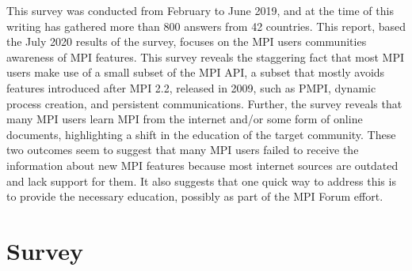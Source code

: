 \documentclass[sigconf,nonacm]{acmart}
\begin{document}
This survey was conducted from February to June 2019, and at the time of
this writing has gathered more than 800 answers from 42 countries.
%
This report, based the July 2020 results of the survey,
focuses on the MPI users communities awareness of MPI features.
%
This survey reveals the staggering fact that most MPI users make use
of a small subset of the MPI API, a subset that mostly avoids features
introduced after MPI 2.2, released in 2009, such as PMPI, dynamic
process creation, and persistent communications. Further, the survey
reveals that many MPI users learn MPI from the internet and/or some
form of online documents, highlighting a shift in the education of the
target community.
%
These two outcomes seem to suggest that many MPI users failed to receive the
information about new MPI features because most internet sources are outdated
and lack support for them. It also suggests that one quick way to address this
is to provide the necessary education, possibly as part of the MPI Forum effort.

\section{Survey}
\end{document}

